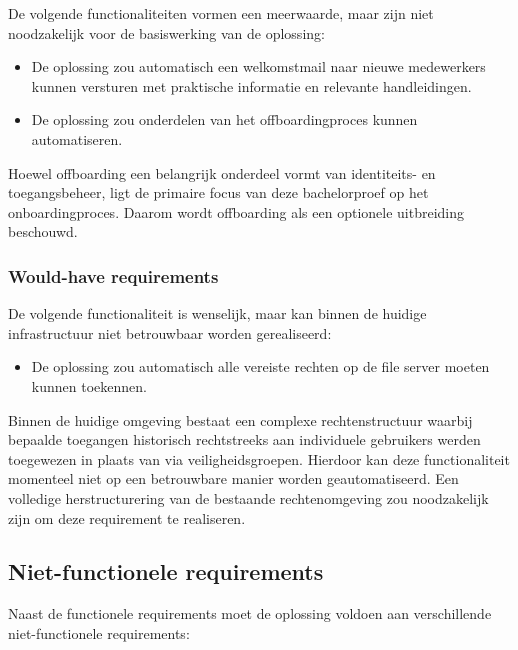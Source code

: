 De volgende functionaliteiten vormen een meerwaarde, maar zijn niet noodzakelijk voor de basiswerking van de oplossing:

\begin{itemize}
    \item De oplossing zou automatisch een welkomstmail naar nieuwe medewerkers kunnen versturen met praktische informatie en relevante handleidingen.
    \item De oplossing zou onderdelen van het offboardingproces kunnen automatiseren.
\end{itemize}

Hoewel offboarding een belangrijk onderdeel vormt van identiteits- en toegangsbeheer, ligt de primaire focus van deze bachelorproef op het onboardingproces. Daarom wordt offboarding als een optionele uitbreiding beschouwd.

\subsubsection{Would-have requirements}

De volgende functionaliteit is wenselijk, maar kan binnen de huidige infrastructuur niet betrouwbaar worden gerealiseerd:

\begin{itemize}
    \item De oplossing zou automatisch alle vereiste rechten op de file server moeten kunnen toekennen.
\end{itemize}

Binnen de huidige omgeving bestaat een complexe rechtenstructuur waarbij bepaalde toegangen historisch rechtstreeks aan individuele gebruikers werden toegewezen in plaats van via veiligheidsgroepen. Hierdoor kan deze functionaliteit momenteel niet op een betrouwbare manier worden geautomatiseerd. Een volledige herstructurering van de bestaande rechtenomgeving zou noodzakelijk zijn om deze requirement te realiseren.

\subsection{Niet-functionele requirements}

Naast de functionele requirements moet de oplossing voldoen aan verschillende niet-functionele requirements:

